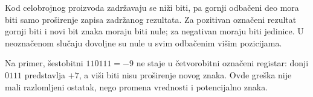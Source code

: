 Kod celobrojnog proizvoda zadržavaju se niži biti, pa gornji odbačeni deo mora biti samo proširenje zapisa zadržanog rezultata. Za pozitivan označeni rezultat gornji biti i novi bit znaka moraju biti nule; za negativan moraju biti jedinice. U neoznačenom slučaju dovoljne su nule u svim odbačenim višim pozicijama.

Na primer, šestobitni $110111=-9$ ne staje u četvorobitni označeni registar: donji $0111$ predstavlja $+7$, a viši biti nisu proširenje novog znaka. Ovde greška nije mali razlomljeni ostatak, nego promena vrednosti i potencijalno znaka.

